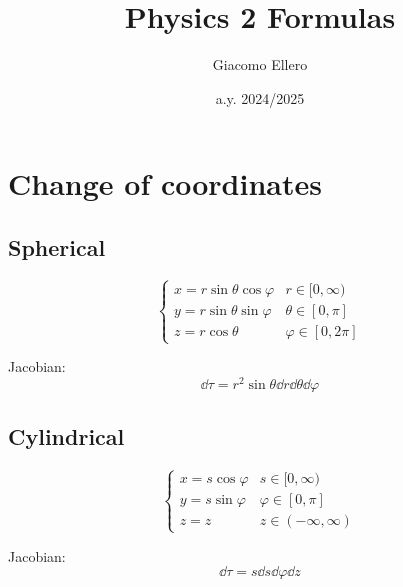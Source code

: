 \documentclass[10pt]{extarticle}
\title{Physics 2 Formulas}
\author{Giacomo Ellero}
\date{a.y. 2024/2025}
\numberwithin{equation}{section}
\begin{document}
\section{Change of coordinates}
\begin{multicols}{2}

    \subsection{Spherical}
    \begin{equation}
        \begin{cases}
            x = r \sin \theta \cos \varphi & r \in [0, \infty)     \\
            y = r \sin \theta \sin \varphi & \theta \in [0, \pi]   \\
            z = r \cos \theta              & \varphi \in [0, 2\pi]
        \end{cases}
    \end{equation}

    Jacobian:
    \begin{equation}
        \dd{\tau} = r^2 \sin \theta \dd{r} \dd{\theta} \dd{\varphi}
    \end{equation}

    \subsection{Cylindrical}
    \begin{equation}
        \begin{cases}
            x = s \cos \varphi & s \in [0, \infty)       \\
            y = s \sin \varphi & \varphi \in [0, \pi]    \\
            z = z              & z \in (-\infty, \infty)
        \end{cases}
    \end{equation}

    Jacobian:
    \begin{equation}
        \dd{\tau} = s \dd{s} \dd{\varphi} \dd{z}
    \end{equation}
\end{multicols}
\end{document}
